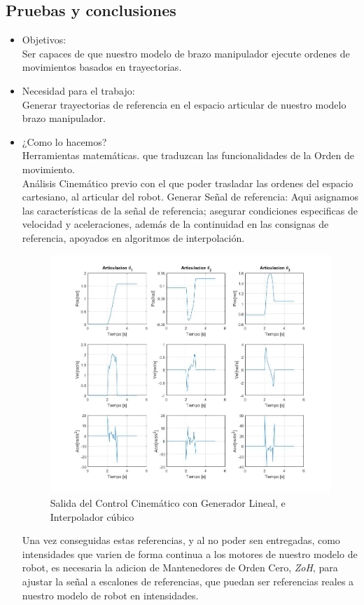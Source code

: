 	
	
	
	\subsection{Pruebas y conclusiones}
	\begin{itemize}
		\item Objetivos: \\
		Ser capaces de que nuestro modelo de brazo manipulador ejecute ordenes de movimientos basados en trayectorias.\\

		\item Necesidad para el trabajo: \\
		Generar trayectorias de referencia en el espacio articular de nuestro modelo brazo manipulador.\\

		\item ¿Como lo hacemos? \\ 
		Herramientas matemáticas. que traduzcan las funcionalidades de la Orden de movimiento. \\ 
		Análisis Cinemático previo con el que poder trasladar las ordenes del espacio cartesiano, al articular del robot.
		Generar Señal de referencia: Aqui asignamos las características de la señal de referencia; asegurar condiciones 
		especificas de velocidad y aceleraciones, además de la continuidad en las consignas de referencia, apoyados en algoritmos
		de interpolación. \\ 

		\begin{figure}[h!]
			\centering
			\includegraphics[width=.4\textwidth]{GeneradorTrayLineal}
			\caption{Salida del Control Cinemático con Generador Lineal, e Interpolador cúbico}
		\end{figure}

		Una vez conseguidas estas referencias, y al no poder sen entregadas, como intensidades que varien de forma continua a los motores
		de nuestro modelo de robot, es necesaria la adicion de Mantenedores de Orden Cero, \textit{ZoH}, para ajustar la señal a escalones
		de referencias, que puedan ser referencias reales a nuestro modelo de robot en intensidades.


\end{itemize}
